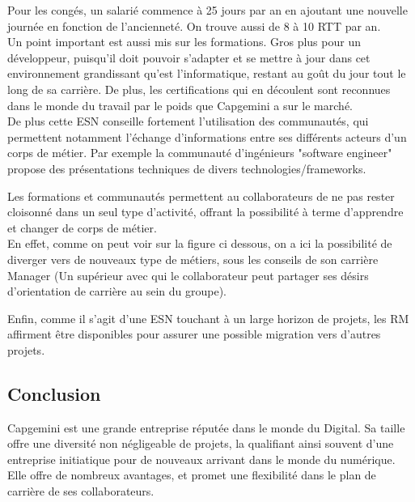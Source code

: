 \documentclass{rapport}
\begin{document}
Pour les congés, un salarié commence à 25 jours par an en ajoutant une nouvelle journée en fonction de l'ancienneté. On trouve aussi de 8 à 10 RTT par an.\\

Un point important est aussi mis sur les formations. Gros plus pour un développeur, puisqu'il doit pouvoir s'adapter et se mettre à jour dans cet environnement grandissant qu'est l'informatique, restant au goût du jour tout le long de sa carrière. De plus, les certifications qui en découlent sont reconnues dans le monde du travail par le poids que Capgemini a sur le marché.\\

De plus cette ESN conseille fortement l'utilisation des communautés, qui permettent notamment l'échange d'informations entre ses différents acteurs d'un corps de métier. Par exemple la communauté d'ingénieurs "software engineer" propose des présentations techniques de divers technologies/frameworks.

Les formations et communautés permettent au collaborateurs de ne pas rester cloisonné dans un seul type d'activité, offrant la possibilité à terme d'apprendre et changer de corps de métier.\\

En effet, comme on peut voir sur la figure ci dessous, on a ici la possibilité de diverger vers de nouveaux type de métiers, sous les conseils de son carrière Manager (Un supérieur avec qui le collaborateur peut partager ses désirs d'orientation de carrière au sein du groupe).\\


Enfin, comme il s'agit d'une ESN touchant à un large horizon de projets, les RM affirment être disponibles pour assurer une possible migration vers d'autres projets. 

\subsection{Conclusion}

Capgemini est une grande entreprise réputée dans le monde du Digital. Sa taille offre une diversité non négligeable de projets, la qualifiant ainsi souvent d'une entreprise initiatique pour de nouveaux arrivant dans le monde du numérique.
Elle offre de nombreux avantages, et promet une flexibilité dans le plan de carrière de ses collaborateurs.
\end{document}
